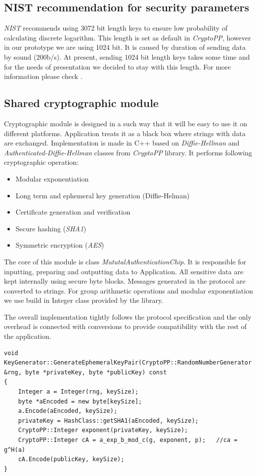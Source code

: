 \documentclass[11pt,titlepage]{article}
\theoremstyle{plain}
\begin{document}
\subsection{NIST recommendation for security parameters}

\textit{NIST} recommends using 3072 bit length keys to ensure low probability of calculating discrete logarithm. This length is set as default in \textit{CryptoPP}, however in our prototype we are using 1024 bit. It is caused by duration of sending data by sound (200b/s). At present, sending 1024 bit length keys takes some time and for the needs of presentation we decided to stay with this length. For more information please check \cite{NIST}.

\subsection{Shared cryptographic module}
Cryptographic module is designed in a such way that it will be easy to use it on different platforms. Application treats it as a black box where strings with data are exchanged. Implementation is made in C++ based on \textit{Diffie-Hellman} and \textit{Authenticated-Diffie-Hellman} classes from \textit{CryptoPP} library. It performs following cryptographic operation:

\begin{itemize}
\item Modular exponentiation
\item Long term and ephemeral key generation (Diffie-Helman)
\item Certificate generation and verification
\item Secure hashing (\textit{SHA1})
\item Symmetric encryption (\textit{AES})
\end{itemize}

The core of this module is class \textit{MututalAuthenticationChip}. It is responsible for inputting, preparing and outputting data to Application. All sensitive data are kept internally using secure byte blocks. Messages generated in the protocol are converted to strings.
For group arithmetic operations and modular exponentiation we use build in Integer class provided by the library. 

\vspace{5mm}

The overall implementation tightly follows the protocol specification and the only overhead is connected with conversions to provide compatibility with the rest of the application.
\begin{lstlisting}
void KeyGenerator::GenerateEphemeralKeyPair(CryptoPP::RandomNumberGenerator &rng, byte *privateKey, byte *publicKey) const
{
    Integer a = Integer(rng, keySize);
    byte *aEncoded = new byte[keySize];
    a.Encode(aEncoded, keySize);
    privateKey = HashClass::getSHA1(aEncoded, keySize);
    CryptoPP::Integer exponent(privateKey, keySize);
    CryptoPP::Integer cA = a_exp_b_mod_c(g, exponent, p);   //ca = g^H(a)
    cA.Encode(publicKey, keySize);
}
\end{lstlisting}
\end{document}
